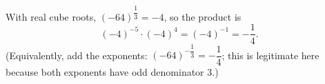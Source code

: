 With real cube roots, $(-64)^{\dfrac{1}{3}}=-4$, so the product is
\[(-4)^{-5}\cdot(-4)^4=(-4)^{-1}=\boxed{-\dfrac{1}{4}}.\]
(Equivalently, add the exponents: $(-64)^{-\dfrac{1}{3}}=-\dfrac{1}{4}$; this is legitimate here because both exponents have odd denominator $3$.)

